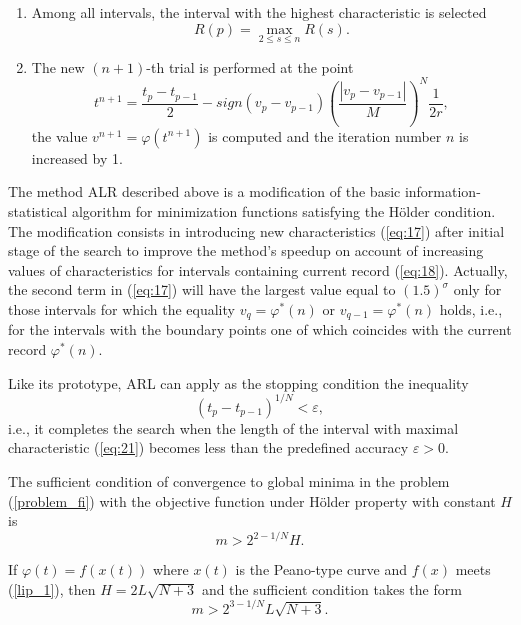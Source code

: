 \documentclass[runningheads]{llncs}
\begin{document}
\begin{enumerate}
\item
Among all intervals, the interval   with the highest characteristic is selected
\begin{equation}\label{eq:21}
R(p) = \max_{2 \leq s \leq n} {R(s)}.
\end{equation}

\item
The new $(n+1)$-th trial is performed at the point
\begin{equation}\label{eq:22}
t^{n+1} = \frac{t_p-t_{p-1}}{2} - sign(v_p-v_{p-1}) \left( \frac{|v_p-v_{p-1}|}{M} \right)^N \frac{1}{2r},
\end{equation}
the value $v^{n+1} = \varphi(t^{n+1})$ is computed and the iteration number $n$ is increased by 1.

\end{enumerate}


The method ALR described above is a modification of the basic information-statistical algorithm \cite{Strongin2000,Sergeyev2013} for minimization functions satisfying the H{\"o}lder condition. The modification consists in introducing new characteristics (\ref{eq:17}) after initial stage of the search to improve the method's speedup on account of increasing values of characteristics for intervals containing current record (\ref{eq:18}). 
Actually, the second term in (\ref{eq:17}) will have the largest value equal to $(1.5)^{\sigma}$ only for those intervals for which the equality $v_q = \varphi^*(n)$ or $v_{q-1} = \varphi^*(n)$ holds, i.e., for the intervals with the boundary points one of which coincides with the current record $\varphi^*(n)$.

Like its prototype, ARL can apply as the stopping condition the inequality
\begin{equation}\label{eq:23}
(t_p-t_{p-1})^{1/N} < \varepsilon,
\end{equation}
i.e., it completes the search when the length of the interval with maximal characteristic (\ref{eq:21}) becomes less than the predefined accuracy $\varepsilon > 0$.

The sufficient condition of convergence to global minima in the problem (\ref{problem_fi}) with the objective function under H{\"o}lder property with constant $H$ is
\begin{equation}\label{eq:24}
m > 2^{2 - 1 / N}H.
\end{equation}

If $\varphi(t) = f(x(t)) $ where $x(t)$ is the Peano-type curve and $f(x)$ meets (\ref{lip_1}), then $H=2L\sqrt{N+3}$ and the sufficient condition takes the form 
\begin{equation}\label{eq:25}
m > 2^{3 - 1 / N}L\sqrt{N+3}.
\end{equation}
\end{document}
